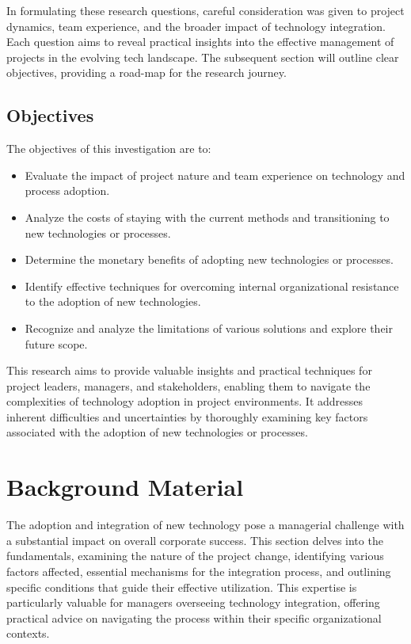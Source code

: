 \documentclass{article}
\begin{document}
\noindent In formulating these research questions, careful consideration was given to project dynamics, team experience, and the broader impact of technology integration. Each question aims to reveal practical insights into the effective management of projects in the evolving tech landscape. The subsequent section will outline clear objectives, providing a road-map for the research journey.



\subsection{Objectives}

The objectives of this investigation are to:

\begin{itemize}
  \item Evaluate the impact of project nature and team experience on technology and process adoption.
  \item Analyze the costs of staying with the current methods and transitioning to new technologies or processes.
  \item Determine the monetary benefits of adopting new technologies or processes.
  \item Identify effective techniques for overcoming internal organizational resistance to the adoption of new technologies.
  \item Recognize and analyze the limitations of various solutions and explore their future scope.
\end{itemize}

\noindent This research aims to provide valuable insights and practical techniques for project leaders, managers, and stakeholders, enabling them to navigate the complexities of technology adoption in project environments. It addresses inherent difficulties and uncertainties by thoroughly examining key factors associated with the adoption of new technologies or processes.

\section{Background Material}
The adoption and integration of new technology pose a managerial challenge with a substantial impact on overall corporate success. This section delves into the fundamentals, examining the nature of the project change, identifying various factors affected, essential mechanisms for the integration process, and outlining specific conditions that guide their effective utilization. This expertise is particularly valuable for managers overseeing technology integration, offering practical advice on navigating the process within their specific organizational contexts.
\end{document}
